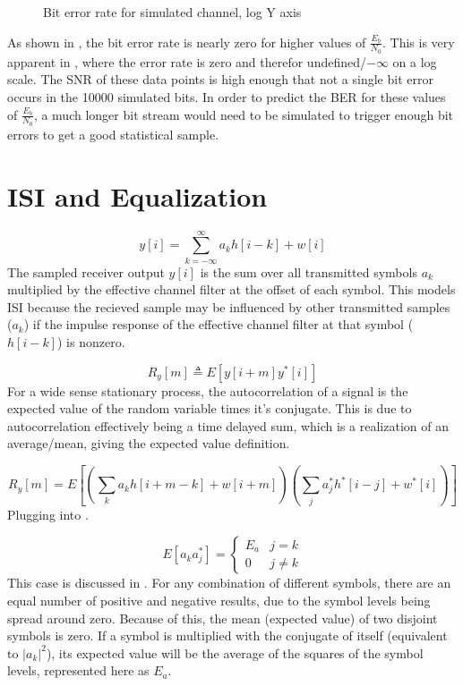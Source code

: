 \documentclass[11pt]{article}
\begin{document}
\begin{figure}[H]
    \centering
    \scalebox{0.7}{}
    \caption{Bit error rate for simulated channel, log Y axis\label{errorlog}}
\end{figure}

As shown in , the bit error rate is nearly zero for higher values of
$\frac{E_b}{N_0}$. This is very apparent in , where the error
rate is zero and therefor undefined/$-\infty$ on a log scale. The SNR of these
data points is high enough that not a single bit error occurs in the 10000
simulated bits. In order to predict the BER for these values of
$\frac{E_b}{N_0}$, a much longer bit stream would need to be simulated to
trigger enough bit errors to get a good statistical sample.

\section{ISI and Equalization}
\begin{equation}\label{ysum}
    y[i] = \sum_{k=-\infty}^{\infty}  a_k h[i-k]+w[i]
\end{equation}
The sampled receiver output $y[i]$ is the sum over all transmitted symbols $a_k$
multiplied by the effective channel filter at the offset of each symbol. This
models ISI because the recieved sample may be influenced by other transmitted
samples ($a_k$) if the impulse response of the effective channel filter at that
symbol ($h[i-k]$) is nonzero.

\begin{equation}\label{autocorr_exp}
    R_y[m] \triangleq E\left[ y[i+m] y^*[i]\right]
\end{equation}
For a wide sense stationary process, the autocorrelation of a signal is the
expected value of the random variable times it's conjugate. This is due to
autocorrelation effectively being a time delayed sum, which is a realization of
an average/mean, giving the expected value definition.

\begin{equation}\label{bigsum}
    R_y[m] = E \left[ \left( \sum_k a_k h[i+m-k]+w[i+m] \right) \left( \sum_j
        a_j^* h^*[i-j]+w^*[i] \right) \right]
\end{equation}
Plugging  into .

\begin{equation}\label{symbol_ea}
    E[a_k a_j^*] =
    \begin{cases}
        E_a & j=k      \\
        0   & j \neq k
    \end{cases}
\end{equation}
This case is discussed in . For any combination of
different symbols, there are an equal number of positive and negative results,
due to the symbol levels being spread around zero. Because of this, the mean
(expected value) of two disjoint symbols is zero. If a symbol is multiplied with
the conjugate of itself (equivalent to $|a_k|^2$), its expected value will be
the average of the squares of the symbol levels, represented here as $E_a$.
\end{document}
